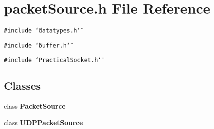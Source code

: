 \section{packet\-Source.h File Reference}
\label{packetSource_8h}
{\tt \#include \char`\"{}datatypes.h\char`\"{}}\par
{\tt \#include \char`\"{}buffer.h\char`\"{}}\par
{\tt \#include \char`\"{}Practical\-Socket.h\char`\"{}}\par
\subsection*{Classes}
\begin{CompactItemize}
\item 
class {\bf Packet\-Source}
\item 
class {\bf UDPPacket\-Source}
\end{CompactItemize}
